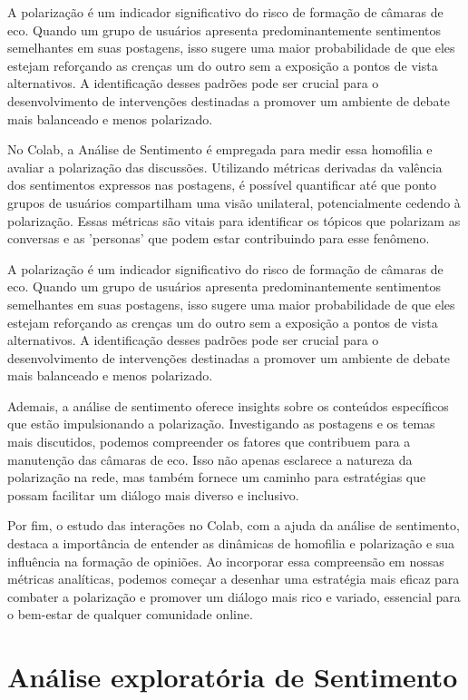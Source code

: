 A polarização é um indicador significativo do risco de formação de câmaras de eco. Quando um grupo de usuários apresenta predominantemente sentimentos semelhantes em suas postagens, isso sugere uma maior probabilidade de que eles estejam reforçando as crenças um do outro sem a exposição a pontos de vista alternativos. A identificação desses padrões pode ser crucial para o desenvolvimento de intervenções destinadas a promover um ambiente de debate mais balanceado e menos polarizado.

No Colab, a Análise de Sentimento é empregada para medir essa homofilia e avaliar a polarização das discussões. Utilizando métricas derivadas da valência dos sentimentos expressos nas postagens, é possível quantificar até que ponto grupos de usuários compartilham uma visão unilateral, potencialmente cedendo à polarização. Essas métricas são vitais para identificar os tópicos que polarizam as conversas e as 'personas' que podem estar contribuindo para esse fenômeno.

A polarização é um indicador significativo do risco de formação de câmaras de eco. Quando um grupo de usuários apresenta predominantemente sentimentos semelhantes em suas postagens, isso sugere uma maior probabilidade de que eles estejam reforçando as crenças um do outro sem a exposição a pontos de vista alternativos. A identificação desses padrões pode ser crucial para o desenvolvimento de intervenções destinadas a promover um ambiente de debate mais balanceado e menos polarizado.

Ademais, a análise de sentimento oferece insights sobre os conteúdos específicos que estão impulsionando a polarização. Investigando as postagens e os temas mais discutidos, podemos compreender os fatores que contribuem para a manutenção das câmaras de eco. Isso não apenas esclarece a natureza da polarização na rede, mas também fornece um caminho para estratégias que possam facilitar um diálogo mais diverso e inclusivo.

Por fim, o estudo das interações no Colab, com a ajuda da análise de sentimento, destaca a importância de entender as dinâmicas de homofilia e polarização e sua influência na formação de opiniões. Ao incorporar essa compreensão em nossas métricas analíticas, podemos começar a desenhar uma estratégia mais eficaz para combater a polarização e promover um diálogo mais rico e variado, essencial para o bem-estar de qualquer comunidade online.

\section{Análise exploratória de Sentimento}

